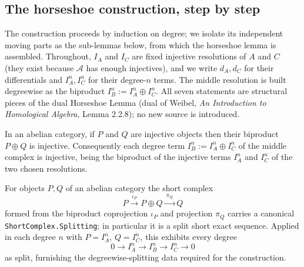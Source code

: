 \subsection{The horseshoe construction, step by step}

The construction proceeds by induction on degree; we isolate its independent moving
parts as the sub-lemmas below, from which the horseshoe lemma is assembled. Throughout,
\(I_A\) and \(I_C\) are fixed injective resolutions of \(A\) and \(C\) (they exist
because \(\mathcal{A}\) has enough injectives), and we write
\(d_A, d_C\) for their differentials and \(I_A^n, I_C^n\) for their degree-\(n\) terms.
The middle resolution is built degreewise as the biproduct
\(I_B^n := I_A^n \oplus I_C^n\). All seven statements are structural pieces of the dual
Horseshoe Lemma (dual of Weibel, \emph{An Introduction to Homological Algebra}, Lemma
2.2.8); no new source is introduced.

\begin{lemma}
  \label{mk-lem:horseshoe_biprod_injective}
  \mathlibok

  In an abelian category, if \(P\) and \(Q\) are injective objects then their biproduct
  \(P \oplus Q\) is injective. Consequently each degree term
  \(I_B^n := I_A^n \oplus I_C^n\) of the middle complex is injective, being the
  biproduct of the injective terms \(I_A^n\) and \(I_C^n\) of the two chosen
  resolutions.
\end{lemma}

\begin{lemma}
  \label{mk-lem:horseshoe_degree_split}
  \mathlibok

  For objects \(P, Q\) of an abelian category the short complex
  \[
    P \xrightarrow{\ \iota_P\ } P \oplus Q \xrightarrow{\ \pi_Q\ } Q
  \]
  formed from the biproduct coprojection \(\iota_P\) and projection \(\pi_Q\) carries a
  canonical \texttt{ShortComplex.Splitting}; in particular it is a split short exact
  sequence. Applied in each degree \(n\) with \(P = I_A^n\), \(Q = I_C^n\), this exhibits
  every degree
  \[
    0 \longrightarrow I_A^n \longrightarrow I_B^n \longrightarrow I_C^n \longrightarrow 0
  \]
  as split, furnishing the degreewise-splitting data required for the construction.
\end{lemma}

